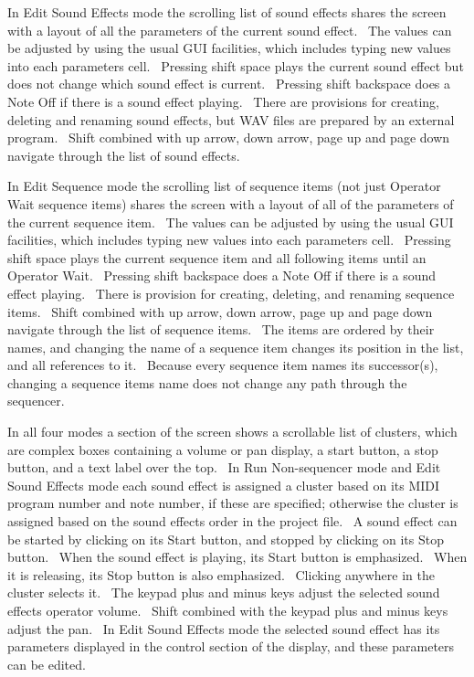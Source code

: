 \documentclass[letterpaper]{article}
\begin{document}
In Edit Sound Effects mode the scrolling list of sound effects shares
the screen with a layout of all the parameters of the current sound
effect. \ The values can be adjusted by using the usual GUI facilities,
which includes typing new values into each parameter{\textquotesingle}s
cell. \ Pressing shift space plays the current sound effect but does
not change which sound effect is current. \ Pressing shift backspace
does a Note Off if there is a sound effect playing. \ There are
provisions for creating, deleting and renaming sound effects, but WAV
files are prepared by an external program. \ Shift combined with up
arrow, down arrow, page up and page down navigate through the list of
sound effects.

In Edit Sequence mode the scrolling list of sequence items (not just
Operator Wait sequence items) shares the screen with a layout of all of
the parameters of the current sequence item. \ The values can be
adjusted by using the usual GUI facilities, which includes typing new
values into each parameter{\textquotesingle}s cell. \ Pressing shift
space plays the current sequence item and all following items until an
Operator Wait. \ Pressing shift backspace does a Note Off if there is a
sound effect playing. \ There is provision for creating, deleting, and
renaming sequence items. \ Shift combined with up arrow, down arrow,
page up and page down navigate through the list of sequence items.
\ The items are ordered by their names, and changing the name of a
sequence item changes its position in the list, and all references to
it. \ Because every sequence item names its successor(s), changing a
sequence item{\textquotesingle}s name does not change any path through
the sequencer.

In all four modes a section of the screen shows a scrollable list of
clusters, which are complex boxes containing a volume or pan display, a
start button, a stop button, and a text label over the top. \ In Run
Non-sequencer mode and Edit Sound Effects mode each sound effect is
assigned a cluster based on its MIDI program number and note number, if
these are specified; otherwise the cluster is assigned based on the
sound effect{\textquotesingle}s order in the project file. \ A sound
effect can be started by clicking on its Start button, and stopped by
clicking on its Stop button. \ When the sound effect is playing, its
Start button is emphasized. \ When it is releasing, its Stop button is
also emphasized. \ Clicking anywhere in the cluster selects it. \ The
keypad plus and minus keys adjust the selected sound
effect{\textquotesingle}s operator volume. \ Shift combined with the
keypad plus and minus keys adjust the pan. \ In Edit Sound Effects mode
the selected sound effect has its parameters displayed in the control
section of the display, and these parameters can be edited.
\end{document}

